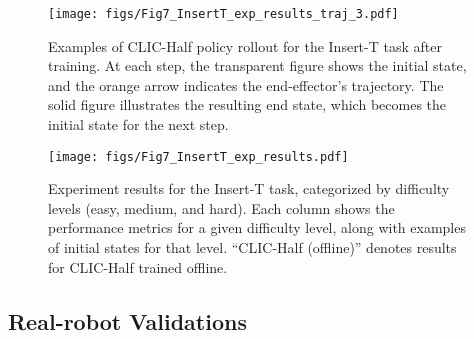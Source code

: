 \begin{figure*}[t]
    \centering
    \texttt{[image: figs/Fig7\_InsertT\_exp\_results\_traj\_3.pdf]}
	\caption{Examples of CLIC-Half policy rollout for the Insert-T task after training. At each step, the transparent figure shows the initial state, and the orange arrow indicates the end-effector’s trajectory. The solid figure illustrates the resulting end state, which becomes the initial state for the next step.}
 \label{fig:Fig7_InsertT_exp_results_traj}
\end{figure*}

\begin{figure}[t]
    \centering
    \texttt{[image: figs/Fig7\_InsertT\_exp\_results.pdf]}
	\caption{Experiment results for the Insert-T task, categorized by difficulty levels (easy, medium, and hard). Each column shows the performance metrics for a given difficulty level, along with examples of initial states for that level.
    ``CLIC-Half (offline)'' denotes results for CLIC-Half trained offline.}
 \label{fig:Fig7_InsertT_exp_results}
\end{figure}

\subsection{Real-robot Validations}
\label{sec:exp:real_rotbo}


